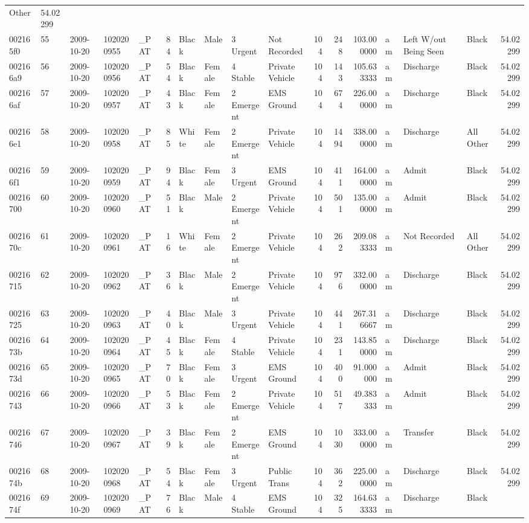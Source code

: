 \documentclass[]{elsarticle} %
\begin{document}
\begin{longtable}[]{@{}lllllrllllrrrlllr@{}}
Other & 54.02299\tabularnewline
002165f0 & 55 & 2009-10-20 & 1020200955 & \_PAT & 84 & Black & Male & 3
Urgent & Not Recorded & 104 & 248 & 103.000000 & am & Left W/out Being
Seen & Black & 54.02299\tabularnewline
002166a9 & 56 & 2009-10-20 & 1020200956 & \_PAT & 54 & Black & Female &
4 Stable & Private Vehicle & 104 & 143 & 105.633333 & am & Discharge &
Black & 54.02299\tabularnewline
002166af & 57 & 2009-10-20 & 1020200957 & \_PAT & 43 & Black & Female &
2 Emergent & EMS Ground & 104 & 674 & 226.000000 & am & Discharge &
Black & 54.02299\tabularnewline
002166e1 & 58 & 2009-10-20 & 1020200958 & \_PAT & 85 & White & Female &
2 Emergent & Private Vehicle & 104 & 1494 & 338.000000 & am & Discharge
& All Other & 54.02299\tabularnewline
002166f1 & 59 & 2009-10-20 & 1020200959 & \_PAT & 94 & Black & Female &
3 Urgent & EMS Ground & 104 & 411 & 164.000000 & am & Admit & Black &
54.02299\tabularnewline
00216700 & 60 & 2009-10-20 & 1020200960 & \_PAT & 51 & Black & Male & 2
Emergent & Private Vehicle & 104 & 501 & 135.000000 & am & Admit & Black
& 54.02299\tabularnewline
0021670c & 61 & 2009-10-20 & 1020200961 & \_PAT & 16 & White & Female &
2 Emergent & Private Vehicle & 104 & 262 & 209.083333 & am & Not
Recorded & All Other & 54.02299\tabularnewline
00216715 & 62 & 2009-10-20 & 1020200962 & \_PAT & 36 & Black & Male & 2
Emergent & Private Vehicle & 104 & 976 & 332.000000 & am & Discharge &
Black & 54.02299\tabularnewline
00216725 & 63 & 2009-10-20 & 1020200963 & \_PAT & 40 & Black & Male & 3
Urgent & Private Vehicle & 104 & 441 & 267.316667 & am & Discharge &
Black & 54.02299\tabularnewline
0021673b & 64 & 2009-10-20 & 1020200964 & \_PAT & 45 & Black & Female &
4 Stable & Private Vehicle & 104 & 231 & 143.850000 & am & Discharge &
Black & 54.02299\tabularnewline
0021673d & 65 & 2009-10-20 & 1020200965 & \_PAT & 70 & Black & Female &
3 Urgent & EMS Ground & 104 & 400 & 91.000000 & am & Admit & Black &
54.02299\tabularnewline
00216743 & 66 & 2009-10-20 & 1020200966 & \_PAT & 53 & Black & Female &
2 Emergent & Private Vehicle & 104 & 517 & 49.383333 & am & Admit &
Black & 54.02299\tabularnewline
00216746 & 67 & 2009-10-20 & 1020200967 & \_PAT & 39 & Black & Female &
2 Emergent & EMS Ground & 104 & 1030 & 333.000000 & am & Transfer &
Black & 54.02299\tabularnewline
0021674b & 68 & 2009-10-20 & 1020200968 & \_PAT & 54 & Black & Female &
3 Urgent & Public Trans & 104 & 362 & 225.000000 & am & Discharge &
Black & 54.02299\tabularnewline
0021674f & 69 & 2009-10-20 & 1020200969 & \_PAT & 76 & Black & Male & 4
Stable & EMS Ground & 104 & 325 & 164.633333 & am & Discharge & Black &

\end{longtable}
\end{document}
